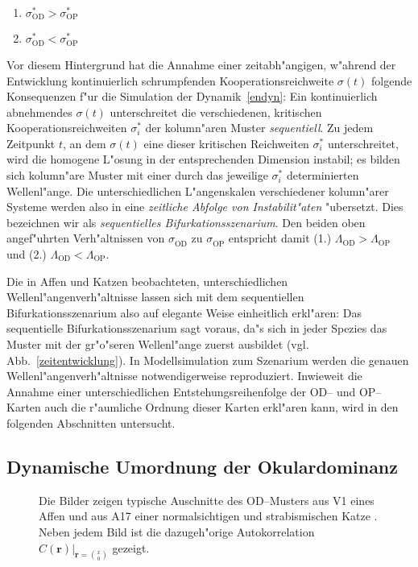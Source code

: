 \begin{enumerate}
\item $\sigma_{\text{OD}}^\ast > \sigma_{\text{OP}}^\ast$ 
\item $\sigma_{\text{OD}}^\ast < \sigma_{\text{OP}}^\ast$ 
\end{enumerate}

Vor diesem Hintergrund hat die Annahme einer zeitabh"angigen, w"ahrend der
Entwicklung kontinuierlich schrumpfenden Kooperationsreichweite $\sigma(t)$
folgende Konsequenzen f"ur die Simulation der Dynamik~\eqref{endyn}: Ein
kontinuierlich abnehmendes $\sigma(t)$ unterschreitet die verschiedenen,
kritischen Kooperationsreichweiten $\sigma_i^\ast$ der 
kolumn"aren Muster \emph{sequentiell}. Zu jedem Zeitpunkt $t$, an dem
$\sigma(t)$ eine dieser kritischen Reichweiten $\sigma_i^\ast$
unterschreitet, wird die homogene L"osung in der entsprechenden Dimension
instabil; es bilden sich kolumn"are Muster mit einer durch das jeweilige
$\sigma_i^\ast$ determinierten Wellenl"ange.  Die unterschiedlichen
L"angenskalen verschiedener kolumn"arer Systeme werden also in eine
\emph{zeitliche Abfolge von Instabilit"aten} "ubersetzt. Dies bezeichnen
wir als \emph{sequentielles Bifurkationsszenarium}.  Den beiden oben
angef"uhrten Verh"altnissen von $\sigma_{\text{OD}}^{\phantom{\ast}}$ zu
$\sigma_{\text{OP}}^{\phantom{\ast}}$ entspricht damit (1.)
$\Lambda_{\text{OD}} > \Lambda_{\text{OP}}$ und (2.) $\Lambda_{\text{OD}} <
\Lambda_{\text{OP}}$.

Die in Affen und Katzen beobachteten, unterschiedlichen
Wellenl"angenverh"altnisse lassen sich mit dem sequentiellen
Bifurkationsszenarium also auf elegante Weise einheitlich erkl"aren: Das
sequentielle Bifurkationsszenarium sagt voraus, da"s sich in jeder Spezies
das Muster mit der gr"o"seren Wellenl"ange zuerst ausbildet
(vgl. Abb.~\ref{zeitentwicklung}). In Modellsimulation zum Szenarium
werden die genauen Wellenl"angenverh"altnisse notwendigerweise
reproduziert.  Inwieweit die Annahme einer unterschiedlichen
Entstehungsreihenfolge der OD-- und OP--Karten auch die r"aumliche Ordnung
dieser Karten erkl"aren kann, wird in den folgenden Abschnitten untersucht.

\subsection{Dynamische Umordnung der Okulardominanz}
\label{odord}

\begin{figure}[t]
\begin{center}
\end{center}
\caption{Die Bilder zeigen typische Auschnitte des OD--Musters aus V1 eines
Affen \protect{} und aus A17 einer normalsichtigen und strabismischen Katze
\protect{}. Neben jedem Bild ist die dazugeh"orige Autokorrelation
$C(\mathbf{r})\vert_{\mathbf{r}={x\choose 0}}$ gezeigt.}
\label{odcorr}
\end{figure}

